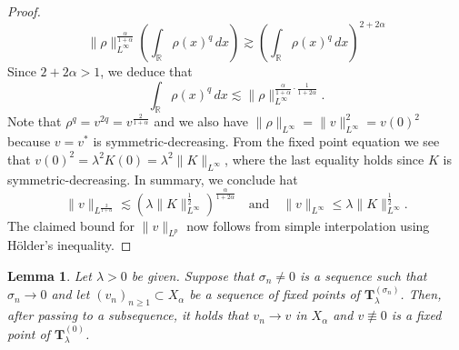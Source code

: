 \documentclass[reqno,10pt,a4paper]{amsart}
\newtheorem{lem}{Lemma}[section]
\theoremstyle{definition}
\theoremstyle{definition}
\theoremstyle{remark}
\theoremstyle{remark}
\numberwithin{equation}{section}
\newcommand{\R}{\mathbb{R}}
\newcommand{\be}{\begin{equation}}
\newcommand{\ee}{\end{equation}}
\newcommand{\Ts}{\mathbf{T}}
\begin{document}
\begin{proof}
\begin{equation}
           \| \rho \|_{L^\infty}^{\frac{\alpha}{1+\alpha}} \left ( \int_{\mathbb{R}} \rho(x)^q \, dx \right ) \gtrsim  \left ( \int_\R \rho(x)^q \, dx \right )^{2+2\alpha}
    \end{equation}
    Since  $2+2 \alpha > 1$, we deduce that
    \be
    \int_{\R} \rho(x)^q \, dx \lesssim \| \rho \|_{L^\infty}^{\frac{\alpha}{1+\alpha} \cdot \frac{1}{1+2 \alpha}}.
     \ee
     Note that $\rho^q = v^{2q} = v^{\frac{2}{1+\alpha}}$ and we also have $\| \rho \|_{L^\infty} = \| v \|_{L^\infty}^2 = v(0)^2$ because $v=v^*$ is symmetric-decreasing. From the fixed point equation we see that $v(0)^2 = \lambda^2 K(0) = \lambda^2 \|K \|_{L^\infty}$, where the last equality holds since $K$ is symmetric-decreasing. In summary, we conclude hat
     \be
     \| v \|_{L^{\frac{2}{1+\alpha}}} \lesssim (\lambda \| K \|_{L^\infty}^{\frac{1}{2}})^{\frac{\alpha}{1+ 2 \alpha}} \quad \mbox{and} \quad \| v \|_{L^\infty} \leq \lambda \| K \|_{L^\infty}^{\frac{1}{2}}.
     \ee
     The claimed bound for $\| v \|_{L^p}$ now follows from simple interpolation using H\"older's inequality.
\end{proof}

\begin{lem} \label{lem:nice}
Let $\lambda > 0$ be given. Suppose that $\sigma_n \neq 0$ is a sequence such that $\sigma_n \to 0$ and let $(v_n)_{n \geq 1} \subset X_\alpha$ be a sequence of fixed points of $\Ts_{\lambda}^{(\sigma_n)}$. Then, after passing to a subsequence, it holds that $v_{n} \to v$ in $X_\alpha$ and $v \not \equiv 0$ is a fixed point of $\Ts_{\lambda}^{(0)}$.
\end{lem}
\end{document}
